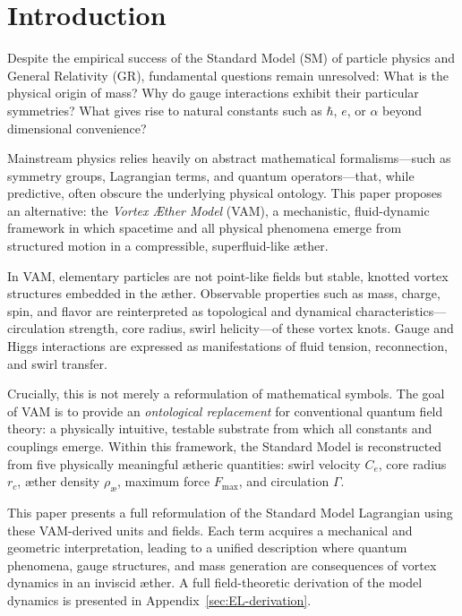 \section{Introduction}\label{sec:inleiding}

Despite the empirical success of the Standard Model (SM) of particle physics and General Relativity (GR), fundamental questions remain unresolved: What is the physical origin of mass? Why do gauge interactions exhibit their particular symmetries? What gives rise to natural constants such as $\hbar$, $e$, or $\alpha$ beyond dimensional convenience?

Mainstream physics relies heavily on abstract mathematical formalisms—such as symmetry groups, Lagrangian terms, and quantum operators—that, while predictive, often obscure the underlying physical ontology. This paper proposes an alternative: the \emph{Vortex Æther Model} (VAM), a mechanistic, fluid-dynamic framework in which spacetime and all physical phenomena emerge from structured motion in a compressible, superfluid-like æther.

In VAM, elementary particles are not point-like fields but stable, knotted vortex structures embedded in the æther. Observable properties such as mass, charge, spin, and flavor are reinterpreted as topological and dynamical characteristics—circulation strength, core radius, swirl helicity—of these vortex knots. Gauge and Higgs interactions are expressed as manifestations of fluid tension, reconnection, and swirl transfer.

Crucially, this is not merely a reformulation of mathematical symbols. The goal of VAM is to provide an \emph{ontological replacement} for conventional quantum field theory: a physically intuitive, testable substrate from which all constants and couplings emerge. Within this framework, the Standard Model is reconstructed from five physically meaningful ætheric quantities: swirl velocity $C_e$, core radius $r_c$, æther density $\rho_\text{\ae}$, maximum force $F_\text{max}$, and circulation $\Gamma$.

This paper presents a full reformulation of the Standard Model Lagrangian using these VAM-derived units and fields. Each term acquires a mechanical and geometric interpretation, leading to a unified description where quantum phenomena, gauge structures, and mass generation are consequences of vortex dynamics in an inviscid æther. A full field-theoretic derivation of the model dynamics is presented in Appendix~\ref{sec:EL-derivation}.

